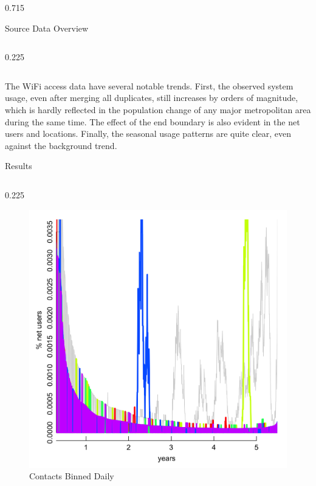 \documentclass[final]{beamer} %
\newenvironment{oneCol}{\begin{column}[t]{0.225\paperwidth}}{\end{column}}
\newenvironment{threeCol}{\begin{column}[t]{0.715\paperwidth}}{\end{column}}
\begin{document}
\begin{frame}{}
\begin{columns}[t]
\begin{threeCol}
\begin{block}{Source Data Overview}
\begin{columns}
\begin{oneCol}
\begin{figure}
      \end{figure}   
    \end{oneCol}
    \end{columns}
    The WiFi access data have several notable trends.  First, the observed system usage, even after merging all duplicates, still increases by orders of magnitude, which is hardly reflected in the population change of any major metropolitan area during the same time.  The effect of the end boundary is also evident in the net users and locations.  Finally, the seasonal usage patterns are quite clear, even against the background trend. 
    \end{block}
    
    \begin{block}{Results}
    \begin{columns}
    \begin{oneCol}
      \setcounter{figure}{0}
      \begin{figure}
        \caption{Contacts Binned Daily}
        \includegraphics[width=1.0\linewidth]{out1.png}
      \end{figure}
      \setcounter{figure}{3}
      \begin{figure}

\end{figure}
\end{oneCol}
\end{columns}
\end{block}
\end{threeCol}
\end{columns}
\end{frame}
\end{document}
